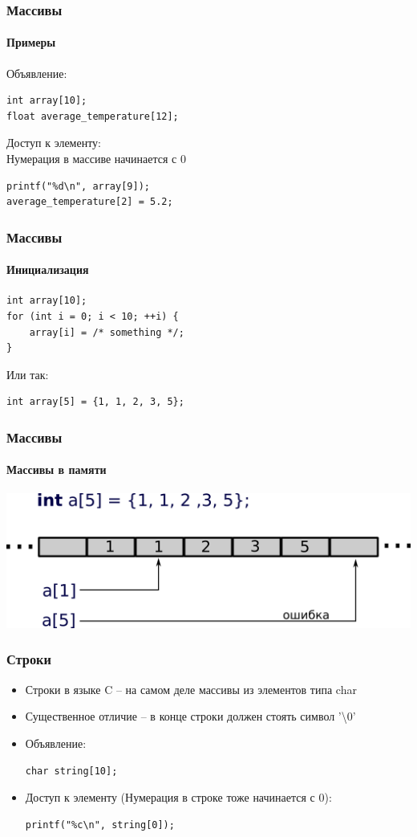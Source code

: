 \documentclass[12pt,pdf,hyperref={unicode}]{beamer}
\begin{document}
\begin{frame}[fragile]
\frametitle{Массивы} 
\framesubtitle{Примеры}
Объявление:\\
\begin{lstlisting}
int array[10];
float average_temperature[12];
\end{lstlisting}
Доступ к элементу:\\
Нумерация в массиве начинается с 0\\
\begin{lstlisting}
printf("%d\n", array[9]);
average_temperature[2] = 5.2;
\end{lstlisting}
\end{frame}

\begin{frame}[fragile]
\frametitle{Массивы} 
\framesubtitle{Инициализация}
\begin{lstlisting}
int array[10];
for (int i = 0; i < 10; ++i) {
    array[i] = /* something */;
}
\end{lstlisting}
Или так:\\
\begin{lstlisting}
int array[5] = {1, 1, 2, 3, 5};
\end{lstlisting}
\end{frame}

\begin{frame}[fragile]
\frametitle{Массивы} 
\framesubtitle{Массивы в памяти}
\begin{center}
\includegraphics[width=0.95\linewidth]{images/array_in_memory.png}
\end{center}
\end{frame}

\begin{frame}[fragile]
\frametitle{Строки} 
\begin{itemize}
\item Строки в языке C -- на самом деле массивы из элементов типа char
\item Существенное отличие -- в конце строки должен стоять символ '\textbackslash 0'
\item Объявление:
\begin{lstlisting}
char string[10];
\end{lstlisting}
\item Доступ к элементу
(Нумерация в строке тоже начинается с 0):\\
\begin{lstlisting}
printf("%c\n", string[0]);
\end{lstlisting}
\end{itemize}
\end{frame}
\end{document}
